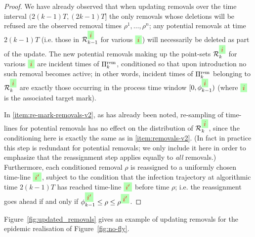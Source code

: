 \documentclass[]{article}
\newcommand{\Removals}{\mathcal{R}}
\newcommand{\Poisson}{\Pi}
\newcommand{\PoissonRem}{\Poisson^\textup{rem}}
\newcommand{\target}{{\colorbox{green!30}{$\textcolor{red}{i}$}}}
\newcommand{\targetm}{{\colorbox{green!30}{$\textcolor{red}{i'}$}}}
\begin{document}
\begin{proof}
We have already observed that when updating removals over the time interval \((2(k{-}1)T, (2k{-}1)T]\) 
the only removals whose deletions will be refused are the observed removal times \(\rho^1,\dots,\rho^n\);
any potential removals at time \(2(k{-}1)T\) 
(i.e. those in \(\Removals^\target_{k-1}\) for various \(\target\)) 
will necessarily be deleted as part of the update. 
The new potential removals making up the point-sets \(\Removals^\target_k\)  for various \(\target\)
are incident times of \(\PoissonRem_k\),
conditioned so that upon introduction no such removal becomes active;
in other words, incident times of \(\PoissonRem_k\) belonging to \(\Removals^\target_k\) 
are exactly those occurring in the process time window \([0,\phi^\target_{k-1})\)
(where \(\target\) is the associated target mark).

In \ref{item:re-mark-removals-v2}, as has already been noted, 
re-sampling of time-lines for potential removals 
has no effect on the distribution of \(\Removals^\target_k\),
since the conditioning here is exactly the same as in \ref{item:removals-v2}. 
(In fact in practice this step is redundant for potential removals; 
we only include it here in order to emphasize that the reassignment step applies equally to
\emph{all} removals.) 
Furthermore, each conditioned removal \(\rho\) is reassigned to a uniformly chosen time-line \(\targetm\), 
subject to the condition that the infection trajectory at algorithmic time \(2(k{-}1)T\) 
has reached time-line \(\targetm\) before time \(\rho\); 
i.e. the reassignment goes ahead if and only if \(\phi^{\targetm}_{k-1}\le \rho\le \rho^{\targetm}\).
\end{proof}

Figure~\ref{fig:updated_removals} gives an example of updating removals for the epidemic realisation
of Figure~\ref{fig:no-fly}. 
\end{document}
